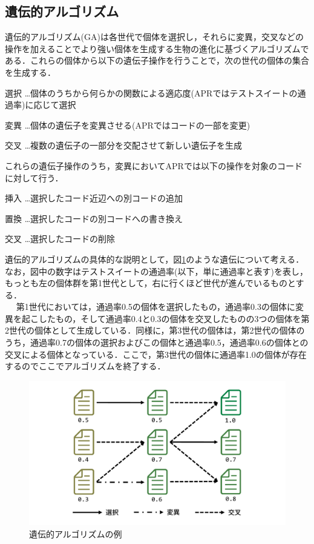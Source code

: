 \documentclass[uplatex,dvipdfmx,a4paper]{jsarticle}
\begin{document}
\subsection{遺伝的アルゴリズム}\label{sec:ga}
遺伝的アルゴリズム(GA)は各世代で個体を選択し，それらに変異，交叉などの操作を加えることでより強い個体を生成する生物の進化に基づくアルゴリズムである．これらの個体から以下の遺伝子操作を行うことで，次の世代の個体の集合を生成する．
\begin{description}
\item{選択} …個体のうちから何らかの関数による適応度(APRではテストスイートの通過率)に応じて選択
\item{変異} …個体の遺伝子を変異させる(APRではコードの一部を変更)
\item{交叉} …複数の遺伝子の一部分を交配させて新しい遺伝子を生成
\end{description}
これらの遺伝子操作のうち，変異においてAPRでは以下の操作を対象のコードに対して行う．\\
\begin{description}
\item{挿入} …選択したコード近辺への別コードの追加
\item{置換} …選択したコードの別コードへの書き換え
\item{交叉} …選択したコードの削除
\end{description}
遺伝的アルゴリズムの具体的な説明として，図\ref{fig:ga}のような遺伝について考える．なお，図中の数字はテストスイートの通過率(以下，単に通過率と表す)を表し，もっとも左の個体群を第1世代として，右に行くほど世代が進んでいるものとする．\\　
第1世代においては，通過率0.5の個体を選択したもの，通過率0.3の個体に変異を起こしたもの，そして通過率0.4と0.3の個体を交叉したものの3つの個体を第2世代の個体として生成している．同様に，第3世代の個体は，第2世代の個体のうち，通過率0.7の個体の選択およびこの個体と通過率0.5，通過率0.6の個体との交叉による個体となっている．ここで，第3世代の個体に通過率1.0の個体が存在するのでここでアルゴリズムを終了する．
\begin{figure}[t]
  \centering
  \includegraphics[width=\linewidth]{fig/ga.pdf}
  \caption{遺伝的アルゴリズムの例}
  \label{fig:ga}
\end{figure}
\end{document}
